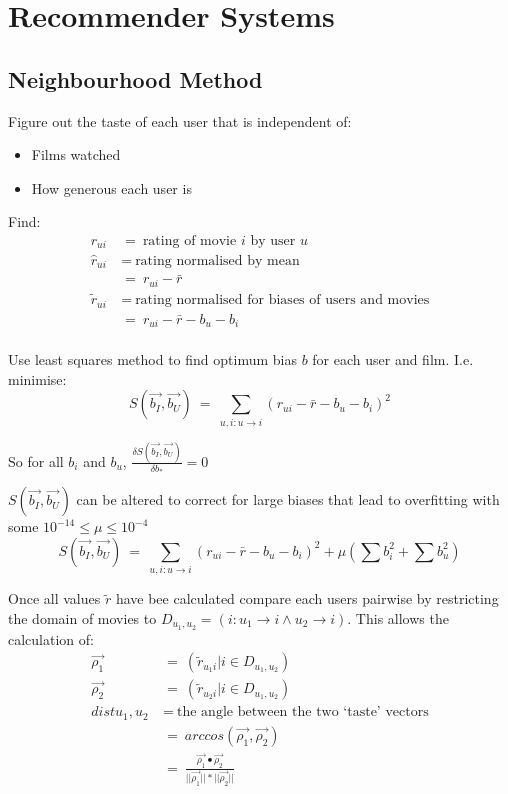 \documentclass[a4paper]{article}
\begin{document}
\section{Recommender Systems}


\subsection{Neighbourhood Method}
Figure out the taste of each user that is independent of:
\begin{itemize}
	\item Films watched 
	\item How generous each user is
\end{itemize}

Find:
\begin{align*}
	r_{ui}\ 
	&=\ \text{rating of movie $i$ by user $u$} \\
	\hat{r}_{ui}\ 
	&=\ \text{rating normalised by mean} \\
	&=\ r_{ui} - \bar{r} \\
	\tilde{r}_{ui}\ 
	&=\ \text{rating normalised for biases of users and movies} \\
	&=\ r_{ui} - \bar{r} - b_u - b_i \\
\end{align*}

Use least squares method to find optimum bias $b$ for each user and film. I.e. minimise:
$$S(\vec{b_I}, \vec{b_U})\ =\ \sum\limits_{u,i:u\rightarrow i} (r_{ui} - \bar{r} - b_u - b_i)^2$$

So for all $b_i$ and $b_u$, $\frac{\delta S(\vec{b_I}, \vec{b_U})}{\delta b_*}=0$

$S(\vec{b_I}, \vec{b_U})$ can be altered to correct for large biases that lead to overfitting with some $10^{-14} \leq \mu \leq 10^{-4}$
$$S(\vec{b_I}, \vec{b_U})\ =\ \sum\limits_{u,i:u\rightarrow i} (r_{ui} - \bar{r} - b_u - b_i)^2 + \mu(\sum b_i^2 + \sum b_u^2)$$

Once all values $\tilde{r}$ have bee calculated compare each users pairwise by restricting the domain of movies to $D_{u_1,u_2}=(i:u_1\rightarrow i \land u_2\rightarrow i)$. This allows the calculation of:
\begin{align*}
	\vec{\rho_1}\ &=\ (\tilde{r}_{u_1 i} | i \in D_{u_1,u_2}) \\
	\vec{\rho_2}\ &=\ (\tilde{r}_{u_2 i} | i \in D_{u_1,u_2}) \\
	dist{u_1, u_2}\ &=\ \text{the angle between the two `taste' vectors} \\
	&=\ arccos(\vec{\rho_1}, \vec{\rho_2}) \\
	&=\ \frac{\vec{\rho_1} \bullet \vec{\rho_2}}{||\vec{\rho_1}|| * ||\vec{\rho_2}||}
\end{align*}
\end{document}

